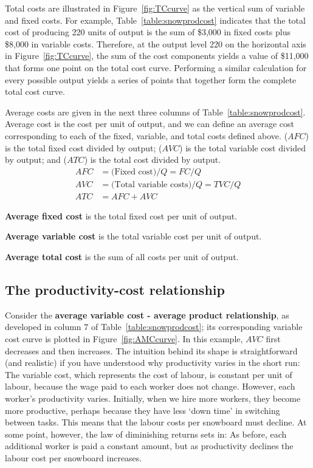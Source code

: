 Total costs are illustrated in Figure~\ref{fig:TCcurve} as the vertical sum
of variable and fixed costs. For example, Table~\ref{table:snowprodcost}
indicates that the total cost of producing 220 units of output is the sum of
\$3,000 in fixed costs plus \$8,000 in variable costs. Therefore, at the
output level 220 on the horizontal axis in Figure~\ref{fig:TCcurve}, the sum
of the cost components yields a value of \$11,000 that forms one point on
the total cost curve. Performing a similar calculation for every possible
output yields a series of points that together form the complete total cost
curve.



\newhtmlpage

Average costs are given in the next three columns of Table~\ref{table:snowprodcost}.
Average cost is the cost per unit of output, and we
can define an average cost corresponding to each of the fixed, variable, and
total costs defined above.  ($AFC$) is the
total fixed cost divided by output; 
($AVC$) is the total variable cost divided by output; and 
 ($ATC$) is the total cost divided by output.
\begin{align*}
	AFC& =\text{(Fixed cost)}/Q=FC/Q \\
	AVC& =\text{(Total variable costs)}/Q=TVC/Q \\
	ATC& =AFC+AVC
\end{align*}

\begin{DefBox}
	\textbf{Average fixed cost} is the total fixed cost per unit of output.
	
	\textbf{Average variable cost} is the total variable cost per unit of output.
	
	\textbf{Average total cost} is the sum of all costs per unit of output.
\end{DefBox}

\newhtmlpage

\subsection*{The productivity-cost relationship}

Consider the \textbf{average variable cost - average product relationship},
as developed in column 7 of Table~\ref{table:snowprodcost}; its
corresponding variable cost curve is plotted in Figure~\ref{fig:AMCcurve}.
In this example, $AVC$ first decreases and then increases. The intuition
behind its shape is straightforward (and realistic) if you have understood
why productivity varies in the short run: The variable cost, which
represents the cost of labour, is constant per unit of labour, because the wage paid to each
worker does not change. However, each worker's productivity varies. Initially,
when we hire more workers, they become more productive, perhaps because they
have less `down time' in switching between tasks. This means that the labour
costs per snowboard must decline. At some point, however, the law of
diminishing returns sets in: As before, each additional worker is paid a
constant amount, but as productivity declines the labour cost per snowboard
increases.

